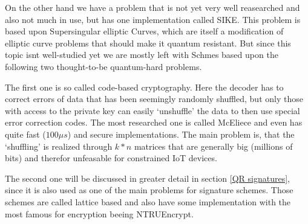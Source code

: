 \documentclass[conference]{IEEEtran}
\begin{document}
On the other hand we have a problem that is not yet very well reasearched and also not much in use, but has one implementation called SIKE. This problem is based upon Supersingular elliptic Curves, which are itself a modification of elliptic curve problems that should make it quantum resistant. But since this topic isnt well-studied yet we are mostly left with Schmes based upon the following two thought-to-be quantum-hard problems.

The first one is so called code-based cryptography. Here the decoder has to correct errors of data that has been seemingly randomly shuffled, but only those with access to the private key can easily `unshuffle' the data to then use special error correction codes. 
The most researched one is called McEliece and even has quite fast ($100 \mu s$) and secure implementations. 
The main problem is, that the `shuffling' is realized through $k*n$ matrices that are generally big (millions of bits) and therefor unfeasable for constrained IoT devices.

The second one will be discussed in greater detail in section \ref{QR signatures}, since it is also used as one of the main problems for signature schemes.
Those schemes are called lattice based and also have some implementation with the most famous for encryption beeing NTRUEncrypt.
\end{document}
